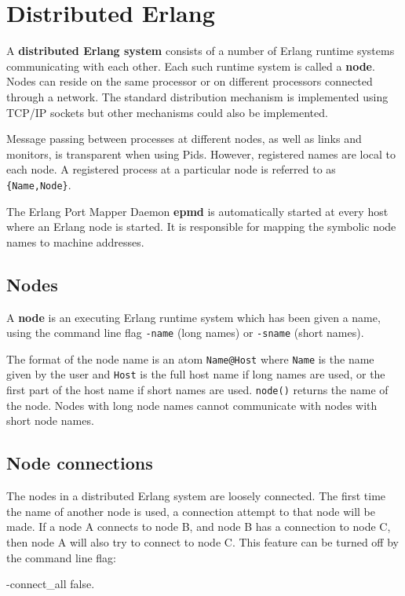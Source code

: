 \chapter{Distributed Erlang}
\label{distribution}

A \textbf{distributed Erlang system} consists of a number of Erlang
runtime systems communicating with each other. Each such runtime
system is called a \textbf{node}. Nodes can reside on the same
processor or on different processors connected through a network. The
standard distribution mechanism is implemented using TCP/IP sockets
but other mechanisms could also be implemented.

Message passing between processes at different nodes, as well as links
and monitors, is transparent when using Pids. However, registered
names are local to each node. A registered process at a particular
node is referred to as \texttt{\{Name,Node\}}.

The Erlang Port Mapper Daemon \textbf{epmd} is automatically started
at every host where an Erlang node is started. It is responsible for
mapping the symbolic node names to machine addresses.


\section{Nodes}
A \textbf{node} is an executing Erlang runtime system which has been
given a name, using the command line flag \texttt{-name} (long names)
or \texttt{-sname} (short names).

The format of the node name is an atom \texttt{Name@Host} where
\texttt{Name} is the name given by the user and \texttt{Host} is the
full host name if long names are used, or the first part of the host
name if short names are used. \texttt{node()} returns the name of the
node. Nodes with long node names cannot communicate with nodes with
short node names.


\section{Node connections}
The nodes in a distributed Erlang system are loosely connected. The
first time the name of another node is used, a connection attempt to
that node will be made. If a node A connects to node B, and node B has
a connection to node C, then node A will also try to connect to node
C. This feature can be turned off by the command line flag:

\begin{erlang}
-connect_all false.
\end{erlang}


